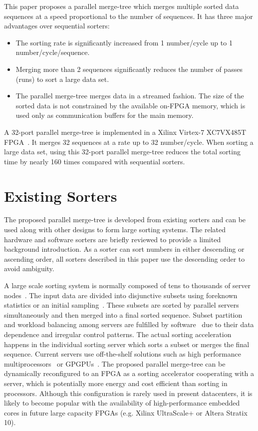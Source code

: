 \documentclass[10pt, conference]{IEEEtran}
\begin{document}
This paper proposes a parallel merge-tree which merges multiple sorted data sequences at a speed proportional to the number of sequences.
It has three major advantages over sequential sorters:
\begin{itemize}
\item The sorting rate is significantly increased from 1 number/cycle up to 1 number/cycle/sequence.
\item Merging more than 2 sequences significantly reduces the number of passes (runs) to sort a large data set.
\item The parallel merge-tree merges data in a streamed fashion.
The size of the sorted data is not constrained by the available on-FPGA memory, which is used only as communication buffers for the main memory.
\end{itemize} 
A 32-port parallel merge-tree is implemented in a Xilinx Virtex-7 XC7VX485T FPGA~\cite{virtex72015}.
It merges 32 sequences at a rate up to 32 number/cycle.
When sorting a large data set, using this 32-port parallel merge-tree reduces the total sorting time by nearly 160 times compared with sequential sorters.

\section{Existing Sorters}

The proposed parallel merge-tree is developed from existing sorters and can be used along with other designs to form large sorting systems.
The related hardware and software sorters are briefly reviewed to provide a limited background introduction.
As a sorter can sort numbers in either descending or ascending order, all sorters described in this paper use the descending order to avoid ambiguity.


A large scale sorting system is normally composed of tens to thousands of server nodes~\cite{SortBenchmark}.
The input data are divided into disjunctive subsets using foreknown statistics or an initial sampling~\cite{Graves2013, Conley2014, Wang2015}.
These subsets are sorted by parallel servers simultaneously and then merged into a final sorted sequence.
Subset partition and workload balancing among servers are fulfilled by software~\cite{Graves2013, Wang2015} due to their data dependence and irregular control patterns.
The actual sorting acceleration happens in the individual sorting server which sorts a subset or merges the final sequence.
Current servers use off-the-shelf solutions such as high performance multiprocessors~\cite{Graves2013, Conley2014, Wang2015} or GPGPUs~\cite{Govindaraju2006,Satish2009}.
The proposed parallel merge-tree can be dynamically reconfigured to an FPGA as a sorting accelerator cooperating with a server,
which is potentially more energy and cost efficient than sorting in processors.
Although this configuration is rarely used in present datacenters, it is likely to become popular with the availability of high-performance embedded cores in future large capacity FPGAs (e.g. Xilinx UltraScale+ or Altera Stratix 10).
\end{document}
